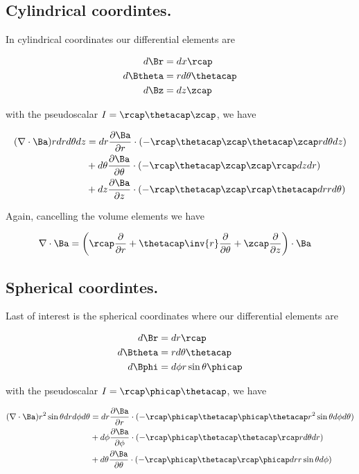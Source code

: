 \subsection{Cylindrical coordintes.}

In cylindrical coordinates our differential elements are

\begin{align*}
d\Br &= dx \rcap \\
d\Btheta &= r d\theta \thetacap \\
d\Bz &= dz \zcap
\end{align*}

with the pseudoscalar $I = \rcap \thetacap \zcap$, we have

\begin{align*}
(\grad \cdot \Ba ) r dr d\theta dz &=
 dr \PD{r}{\Ba} \cdot (-\rcap \thetacap \zcap \thetacap \zcap r d\theta dz )  \\
&+d\theta \PD{\theta}{\Ba} \cdot (-\rcap \thetacap \zcap \zcap \rcap dz dr )  \\
&+dz \PD{z}{\Ba} \cdot (-\rcap \thetacap \zcap \rcap \thetacap dr r d\theta )
\end{align*}

Again, cancelling the volume elements we have

\begin{align}\label{eqn:cylindricalGradDot}
\grad \cdot \Ba &=
\left(\rcap \PD{r}{}
+\thetacap \inv{r} \PD{\theta}{}
+\zcap \PD{z}{} \right) \cdot \Ba
\end{align}

\subsection{Spherical coordintes.}

Last of interest is the spherical coordinates where our differential elements are

\begin{align*}
d\Br &= dr \rcap \\
d\Btheta &= r d\theta \thetacap \\
d\Bphi &= d\phi r \sin\theta \phicap
\end{align*}

with the pseudoscalar $I = \rcap \phicap \thetacap$, we have

\begin{align*}
(\grad \cdot \Ba ) r^2 \sin\theta dr d\phi d\theta &=
 dr \PD{r}{\Ba} \cdot (-\rcap \phicap \thetacap \phicap \thetacap r^2 \sin\theta d\phi d\theta )  \\
&+d\phi \PD{\phi}{\Ba} \cdot (-\rcap \phicap \thetacap \thetacap \rcap r d\theta dr )  \\
&+d\theta \PD{\theta}{\Ba} \cdot (-\rcap \phicap \thetacap \rcap \phicap dr r \sin\theta d\phi )
\end{align*}

